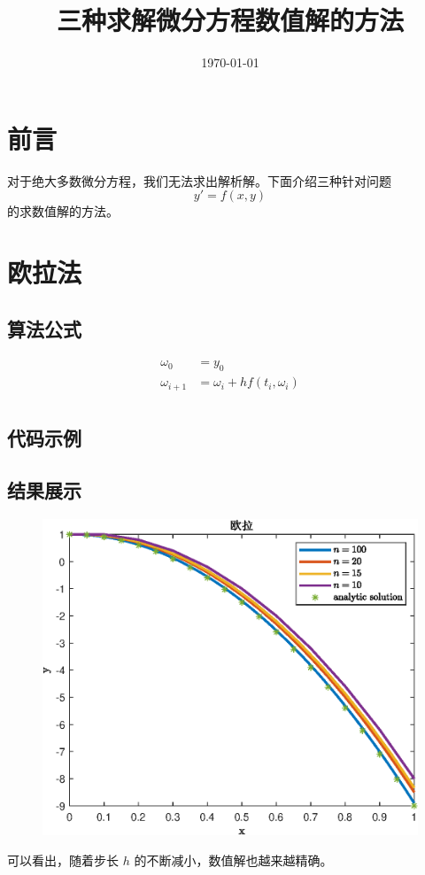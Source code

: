 \documentclass{ctexart}
\author{}
\date{\today}
\title{三种求解微分方程数值解的方法}
\numberwithin{equation}{section}    %
\begin{document}
\maketitle
\tableofcontents
\newpage
\section{前言}
对于绝大多数微分方程，我们无法求出解析解。下面介绍三种针对问题
\begin{equation}
    y' = f(x,y)
\end{equation}
的求数值解的方法。
\section{欧拉法}
\subsection{算法公式}
\begin{equation}
    \begin{aligned}
        \omega_0 &= y_0\\
        \omega_{i+1} & = \omega_i + hf(t_i,\omega_i)\\
    \end{aligned}
\end{equation}
\subsection{代码示例}



\subsection{结果展示}

\begin{figure}[htp]
    \centering
    \includegraphics[width=0.7\linewidth]{fig/欧拉}
\end{figure}
可以看出，随着步长 $h$ 的不断减小，数值解也越来越精确。
\end{document}
